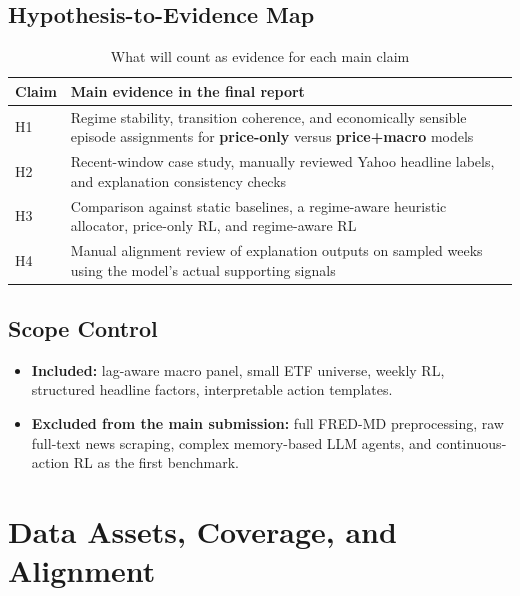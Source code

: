 \documentclass[11pt,a4paper]{article}
\begin{document}
\subsection{Hypothesis-to-Evidence Map}

\begin{table}[H]
\centering
\caption{What will count as evidence for each main claim}
\begin{tabularx}{\textwidth}{@{}P{0.16\textwidth}Y@{}}
\toprule
{}
\textbf{Claim} & \textbf{Main evidence in the final report} \\
\midrule
H1 & Regime stability, transition coherence, and economically sensible episode assignments for \textbf{price-only} versus \textbf{price+macro} models \\
H2 & Recent-window case study, manually reviewed Yahoo headline labels, and explanation consistency checks \\
H3 & Comparison against static baselines, a regime-aware heuristic allocator, price-only RL, and regime-aware RL \\
H4 & Manual alignment review of explanation outputs on sampled weeks using the model's actual supporting signals \\
\bottomrule
\end{tabularx}
\end{table}

\subsection{Scope Control}

\begin{warningbox}[title=\textbf{Explicit Scope Control}]
\begin{itemize}[leftmargin=1.4em]
  \item \textbf{Included:} lag-aware macro panel, small ETF universe, weekly RL, structured headline factors, interpretable action templates.
  \item \textbf{Excluded from the main submission:} full FRED-MD preprocessing, raw full-text news scraping, complex memory-based LLM agents, and continuous-action RL as the first benchmark.
\end{itemize}
\end{warningbox}

\section{Data Assets, Coverage, and Alignment}
\end{document}
